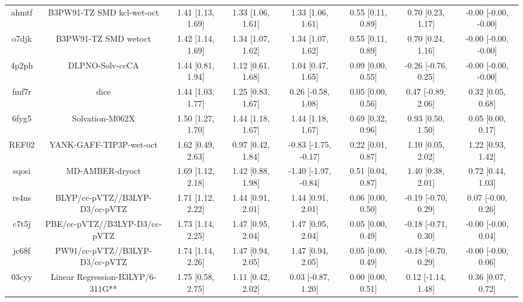 \documentclass{article}
\begin{document}
\begin{center}
\begin{longtable}{|cccccccc|}
 ahmtf &                          B3PW91-TZ SMD kcl-wet-oct &  1.41 [1.13, 1.69] &  1.33 [1.06, 1.61] &     1.33 [1.06, 1.61] &  0.55 [0.11, 0.89] &    0.70 [0.23, 1.17] &  -0.00 [-0.00, -0.00] \\
 o7djk &                               B3PW91-TZ SMD wetoct &  1.42 [1.14, 1.69] &  1.34 [1.07, 1.62] &     1.34 [1.07, 1.62] &  0.55 [0.11, 0.89] &    0.70 [0.24, 1.16] &  -0.00 [-0.00, -0.00] \\
 4p2ph &                                    DLPNO-Solv-ccCA &  1.44 [0.81, 1.94] &  1.12 [0.61, 1.68] &     1.04 [0.47, 1.65] &  0.09 [0.00, 0.55] &  -0.26 [-0.76, 0.25] &  -0.00 [-0.00, -0.00] \\
 fmf7r &                                               dice &  1.44 [1.03, 1.77] &  1.25 [0.83, 1.67] &    0.26 [-0.58, 1.08] &  0.05 [0.00, 0.56] &   0.47 [-0.89, 2.06] &     0.32 [0.05, 0.68] \\
 6fyg5 &                                    Solvation-M062X &  1.50 [1.27, 1.70] &  1.44 [1.18, 1.67] &     1.44 [1.18, 1.67] &  0.69 [0.32, 0.96] &    0.93 [0.50, 1.50] &     0.05 [0.00, 0.17] \\
 REF02 &                            YANK-GAFF-TIP3P-wet-oct &  1.62 [0.49, 2.63] &  0.97 [0.42, 1.84] &  -0.83 [-1.75, -0.17] &  0.22 [0.01, 0.87] &    1.10 [0.05, 2.02] &     1.22 [0.93, 1.42] \\
 sqosi &                                    MD-AMBER-dryoct &  1.69 [1.12, 2.18] &  1.42 [0.88, 1.98] &  -1.40 [-1.97, -0.84] &  0.51 [0.04, 0.87] &    1.40 [0.38, 2.01] &     0.72 [0.44, 1.03] \\
 rs4ns &                     BLYP/cc-pVTZ//B3LYP-D3/cc-pVTZ &  1.71 [1.12, 2.22] &  1.44 [0.91, 2.01] &     1.44 [0.91, 2.01] &  0.06 [0.00, 0.50] &  -0.19 [-0.70, 0.29] &    0.07 [-0.00, 0.26] \\
 c7t5j &                      PBE/cc-pVTZ//B3LYP-D3/cc-pVTZ &  1.73 [1.14, 2.25] &  1.47 [0.95, 2.04] &     1.47 [0.95, 2.04] &  0.05 [0.00, 0.49] &  -0.18 [-0.71, 0.30] &   -0.00 [-0.00, 0.04] \\
 jc68f &                     PW91/cc-pVTZ//B3LYP-D3/cc-pVTZ &  1.74 [1.14, 2.26] &  1.47 [0.94, 2.05] &     1.47 [0.94, 2.05] &  0.05 [0.00, 0.49] &  -0.18 [-0.70, 0.29] &   -0.00 [-0.00, 0.06] \\
 03cyy &                   Linear Regression-B3LYP/6-311G** &  1.75 [0.58, 2.75] &  1.11 [0.42, 2.02] &    0.03 [-0.87, 1.20] &  0.00 [0.00, 0.51] &   0.12 [-1.14, 1.48] &     0.36 [0.07, 0.72] \\

\end{longtable}
\end{center}
\end{document}
